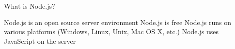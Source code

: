 What is Node.js?

Node.js is an open source server environment
Node.js is free
Node.js runs on various platforms (Windows, Linux, Unix, Mac OS X, etc.)
Node.js uses JavaScript on the server